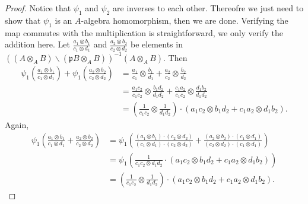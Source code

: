 \documentclass[10pt,a4paper]{amsart}
\begin{document}
\begin{proof}
Notice that $\psi_1$ and $\psi_2$ are inverses to each other. Thereofre we just need to show that $\psi_1$ is an $A$-algebra homomorphism, then we are done. Verifying the map commutes with the multiplication is straightforward, we only verify the addition here. 
   Let $\frac{a_1 \otimes b_1}{c_1 \otimes d_1}$ and $\frac{a_2 \otimes b_2}{c_2 \otimes d_2}$ be elements in $( (A \otimes_A B) \backslash (\mathfrak{p}B \otimes_A B) )^{-1} (A \otimes_A B)$. Then
	\begin{align*}
	\psi_1 \left(\frac{a_1 \otimes b_1}{c_1 \otimes d_1}\right) +  \psi_1 \left(\frac{a_2 \otimes b_2}{c_2 \otimes d_2}\right)&=\frac{a_1}{c_1} \otimes \frac{b_1}{d_1} + \frac{a_2}{c_2} \otimes \frac{b_2}{d_2}\\
	&= \frac{a_1 c_2}{c_1 c_2} \otimes \frac{b_1 d_2}{d_1 d_2} + \frac{c_1 a_2}{c_1 c_2} \otimes \frac{d_1 b_2}{d_1 d_2} \\
	&=\left(\frac{1}{c_1 c_2} \otimes \frac{1}{d_1 d_2}\right) \cdot ( a_1 c_2 \otimes b_1 d_2 + c_1 a_2 \otimes d_1 b_2 ).
	\end{align*}
Again, 	
\begin{align*}
\psi_1 \left( \frac{a_1 \otimes b_1}{c_1 \otimes d_1} + \frac{a_2 \otimes b_2}{c_2 \otimes d_2} \right) &= \psi_1 \left( \frac{ (a_1 \otimes b_1) \cdot (c_2 \otimes d_2)}{ (c_1 \otimes d_1) \cdot (c_2 \otimes d_2) } + \frac{ (a_2 \otimes b_2) \cdot (c_1 \otimes d_1)}{ (c_2 \otimes d_2) \cdot (c_1 \otimes d_1) } \right)\\
& = \psi_1 \left( \frac{1}{c_1 c_2 \otimes d_1 d_2} \cdot (a_1 c_2 \otimes b_1 d_2 + c_1 a_2 \otimes d_1 b_2) \right) \\
&= \left(\frac{1}{c_1 c_2} \otimes \frac{1}{d_1 d_2}\right) \cdot \left( a_1 c_2 \otimes b_1 d_2 + c_1 a_2 \otimes d_1 b_2 \right).
\end{align*}
	\end{proof}
\end{document}
